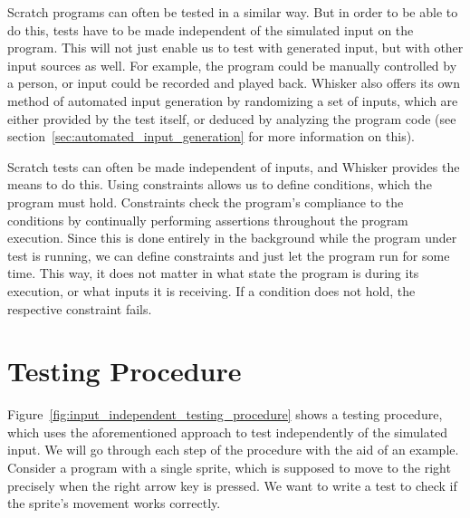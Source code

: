 Scratch programs can often be tested in a similar way.
But in order to be able to do this, tests have to be made independent of the simulated input on the program.
This will not just enable us to test with generated input, but with other input sources as well.
For example, the program could be manually controlled by a person, or input could be recorded and played back.
Whisker also offers its own method of automated input generation by randomizing a set of inputs,
which are either provided by the test itself, or deduced by analyzing the program code (see section~\ref{sec:automated_input_generation} for more information on this).
\parspace

Scratch tests can often be made independent of inputs, and Whisker provides the means to do this.
Using constraints allows us to define conditions, which the program must hold.
Constraints check the program's compliance to the conditions by continually performing assertions throughout the program execution.
Since this is done entirely in the background while the program under test is running, we can define constraints and just let the program run for some time.
This way, it does not matter in what state the program is during its execution, or what inputs it is receiving.
If a condition does not hold, the respective constraint fails.

\section{Testing Procedure}
\label{sec:constraint_testing_procedure}

Figure~\ref{fig:input_independent_testing_procedure} shows a testing procedure, which uses the aforementioned approach to test independently of the simulated input.
We will go through each step of the procedure with the aid of an example.
Consider a program with a single sprite, which is supposed to move to the right precisely when the right arrow key is pressed.
We want to write a test to check if the sprite's movement works correctly.

